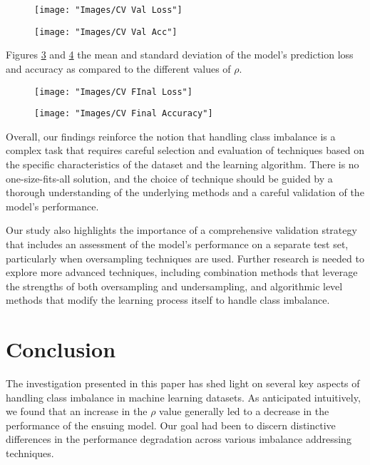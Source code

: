 \documentclass[journal]{IEEEtran}
\begin{document}
	
\begin{figure}
	\centering
	\texttt{[image: "Images/CV Val Loss"]}
	\caption{}
	\label{fig:cv-val-loss}
\end{figure}
	
	
\begin{figure}
	\centering
	\texttt{[image: "Images/CV Val Acc"]}
	\caption{}
	\label{fig:cv-val-acc}
\end{figure}
	
	Figures \ref{fig:cv-final-loss} and \ref{fig:cv-final-accuracy} the mean and standard deviation of the model's prediction loss and accuracy
	as compared to the different values of $\rho$.
		
	
\begin{figure}
	\centering
	\texttt{[image: "Images/CV FInal Loss"]}
	\caption{}
	\label{fig:cv-final-loss}
\end{figure}

\begin{figure}
	\centering
	\texttt{[image: "Images/CV Final Accuracy"]}
	\caption{}
	\label{fig:cv-final-accuracy}
\end{figure}
	
	Overall, our findings reinforce the notion that handling class imbalance is a complex task that requires careful selection and evaluation of techniques based on the specific characteristics of the dataset and the learning algorithm. There is no one-size-fits-all solution, and the choice of technique should be guided by a thorough understanding of the underlying methods and a careful validation of the model's performance.
	
	Our study also highlights the importance of a comprehensive validation strategy that includes an assessment of the model's performance on a separate test set, particularly when oversampling techniques are used. Further research is needed to explore more advanced techniques, including combination methods that leverage the strengths of both oversampling and undersampling, and algorithmic level methods that modify the learning process itself to handle class imbalance.
	
	
	
	\section{Conclusion}
	\label{sec:conclusion}
	
	The investigation presented in this paper has shed light on several key aspects of handling class imbalance in machine learning datasets. As anticipated intuitively, we found that an increase in the $\rho$ value generally led to a decrease in the performance of the ensuing model. Our goal had been to discern distinctive differences in the performance degradation across various imbalance addressing techniques.
	
\end{document}
